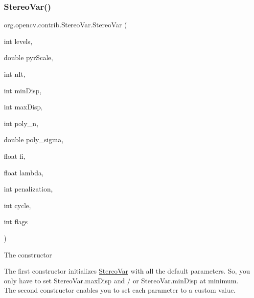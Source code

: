 \subsubsection{\texorpdfstring{Stereo\+Var()}{StereoVar()}\hspace{0.1cm}{\footnotesize\ttfamily [3/3]}}
{\footnotesize\ttfamily org.\+opencv.\+contrib.\+Stereo\+Var.\+Stereo\+Var (\begin{DoxyParamCaption}\item[{int}]{levels,  }\item[{double}]{pyr\+Scale,  }\item[{int}]{n\+It,  }\item[{int}]{min\+Disp,  }\item[{int}]{max\+Disp,  }\item[{int}]{poly\+\_\+n,  }\item[{double}]{poly\+\_\+sigma,  }\item[{float}]{fi,  }\item[{float}]{lambda,  }\item[{int}]{penalization,  }\item[{int}]{cycle,  }\item[{int}]{flags }\end{DoxyParamCaption})}

The constructor

The first constructor initializes {\ttfamily \mbox{\hyperlink{classorg_1_1opencv_1_1contrib_1_1_stereo_var}{Stereo\+Var}}} with all the default parameters. So, you only have to set {\ttfamily Stereo\+Var.\+max\+Disp} and / or {\ttfamily Stereo\+Var.\+min\+Disp} at minimum. The second constructor enables you to set each parameter to a custom value.


